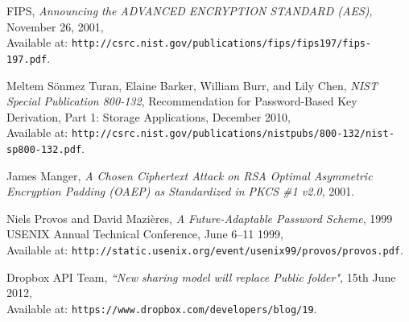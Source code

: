 \documentclass[12pt, titlepage]{article}
\begin{document}
\begin{thebibliography}{10}
FIPS, \emph{Announcing the ADVANCED ENCRYPTION STANDARD (AES)}, November 26, 2001,
\\ Available at:
\texttt{http://csrc.nist.gov/publications/fips/fips197/fips-197.pdf}.

Meltem Sönmez Turan, Elaine Barker, William Burr, and Lily Chen, \emph{NIST Special Publication 800-132}, Recommendation for Password-Based Key Derivation, Part 1: Storage Applications, December 2010,
\\ Available at: \texttt{http://csrc.nist.gov/publications/nistpubs/800-132/nist-sp800-132.pdf}.

James Manger, \emph{A Chosen Ciphertext Attack on RSA Optimal Asymmetric Encryption Padding (OAEP) as Standardized in PKCS \#1 v2.0}, 2001.

Niels Provos and David Mazières, \emph{A Future-Adaptable Password Scheme}, 1999 USENIX Annual Technical Conference, June 6–11 1999,
\\ Available at: \texttt{http://static.usenix.org/event/usenix99/provos/provos.pdf}. 

Dropbox API Team, \emph{``New sharing model will replace Public folder"},  15th June 2012,
\\ Available at: \texttt{https://www.dropbox.com/developers/blog/19}.

\end{thebibliography}
\end{document}
